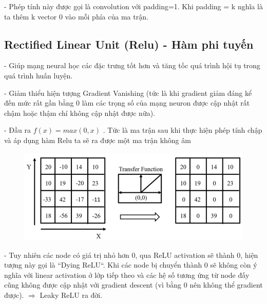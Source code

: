 \documentclass[12pt, a4paper]{article}
\begin{document}
\par \hspace{1cm}- Phép tính này được gọi là convolution với padding=1. Khi padding = k nghĩa là ta thêm k vector 0 vào mỗi phía của ma trận.


\subsection{Rectified Linear Unit (Relu) - Hàm phi tuyến}
\par \hspace{1cm}- Giúp mạng neural học các đặc trưng tốt hơn và tăng tốc quá trình hội tụ trong quá trình huấn luyện.
\par \hspace{1cm}- Giảm thiểu hiện tượng Gradient Vanishing (tức là khi gradient giảm đáng kể đến mức rất gần bằng 0 làm các trọng số của mạng neuron được cập nhật rất chậm hoặc thậm chí không cập nhật được nữa). 
\par \hspace{1cm}- Đầu ra $f(x) = max(0, x)$ . Tức là ma trận sau khi thực hiện phép tính chập và áp dụng hàm Relu ta sẽ ra được một ma trận không âm
\begin{figure}[h] %
    \centering
    \includegraphics[scale = 0.6]{Img/Relu1.png}
\end{figure}
\par \hspace{1cm}- Tuy nhiên các node có giá trị nhỏ hơn 0, qua ReLU activation sẽ thành 0, hiện tượng này gọi là “Dying ReLU“. Khi các node bị chuyển thành 0 sẽ không còn ý nghĩa với linear activation ở lớp tiếp theo và các hệ số tương ứng từ node đấy cũng không được cập nhật với gradient descent (vì bằng 0 nên không thể gradient được). $\Rightarrow$ Leaky ReLU ra đời.

\newpage
\end{document}
